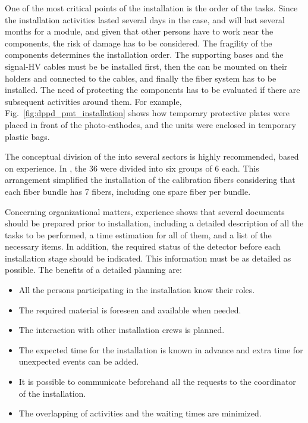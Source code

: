 One of the most critical points of the installation is the order of the tasks. Since the installation activities lasted several days in the  case, and will last several months for a  module, and given that other persons have to work near the  components, the risk of damage has to be considered. The fragility of the components determines the installation order. The  supporting bases and the signal-HV  cables must be be installed first, then the  can be mounted on their holders and connected to the cables, and finally the fiber system has to be installed. The need of protecting the components has to be evaluated if there are subsequent activities around them. For example, Fig.~\ref{fig:dppd_pmt_installation} shows how temporary protective plates were placed in front of the   photo-cathodes, and the  units were enclosed in temporary plastic bags. 

The conceptual division of the   into several sectors is highly recommended, based on  experience. In , the \num{36}  were divided into six groups of \num{6}  each. This arrangement simplified the installation of the calibration fibers considering that each fiber bundle has \num{7} fibers, including one spare fiber per bundle. 

Concerning organizational matters,  experience shows that several documents should be prepared prior to installation, including a detailed description of all the tasks to be performed, a time estimation for all of them, and a list of the necessary items. In addition, the required status of the detector before each installation stage should be indicated. This information must be as detailed as possible. The benefits of a detailed planning are:

\begin{itemize}
\item All the persons participating in the  installation know their roles.
\item The required material is foreseen and available when needed.
\item The interaction with other installation crews is planned.
\item The expected time for the installation is known in advance and extra time for unexpected events can be added.
\item It is possible to communicate beforehand all the requests to the coordinator of the installation.
\item The overlapping of activities and the waiting times are minimized. 
\end{itemize}
